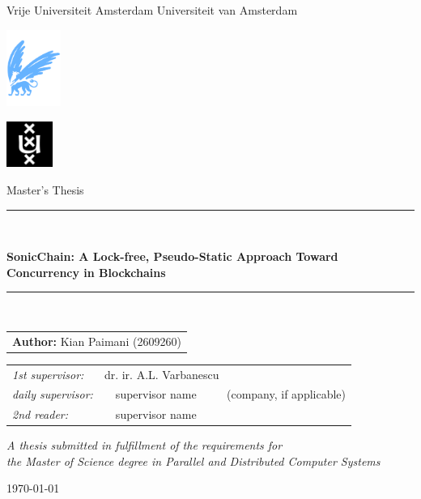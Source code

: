 \documentclass[oneside,11pt]{Latex/Classes/PhDthesisPSnPDF}
\theoremstyle{definition}
\theoremstyle{remark}
\begin{document}
\thispagestyle{empty}

\begin{center}

Vrije Universiteit Amsterdam \hspace*{2cm} Universiteit van Amsterdam

\vspace{1mm}

\hspace*{-7.5cm}\includegraphics[height=25mm]{0_frontmatter/figures/vu-griffioen.pdf}

\vspace*{-2cm}\hspace*{7.5cm}\includegraphics[height=15mm]{0_frontmatter/figures/uva_logo.jpg}

\vspace{2cm}

{\Large Master's Thesis}

\vspace*{1.5cm}

\rule{.9\linewidth}{.6pt}\\[0.4cm]
{\huge \bfseries SonicChain: A Lock-free, Pseudo-Static Approach Toward Concurrency in Blockchains\par}\vspace{0.4cm}
\rule{.9\linewidth}{.6pt}\\[1.5cm]

\vspace*{1.8mm}

{\Large
\begin{tabular}{l}
{\bf Author:} Kian Paimani (2609260)
\end{tabular}
}

\vspace*{1cm}

\begin{tabular}{ll}
{\it 1st supervisor:}   & dr. ir. A.L. Varbanescu \\
{\it daily supervisor:} & ~~supervisor name ~~~~ (company, if applicable) \\
{\it 2nd reader:}       & ~~supervisor name
\end{tabular}

\vspace*{2.5cm}

\textit{A thesis submitted in fulfillment of the requirements for\\ the Master of Science degree in Parallel and Distributed Computer Systems}

\vspace*{1.8cm}

\today\\[4cm] %

\end{center}
\end{document}
